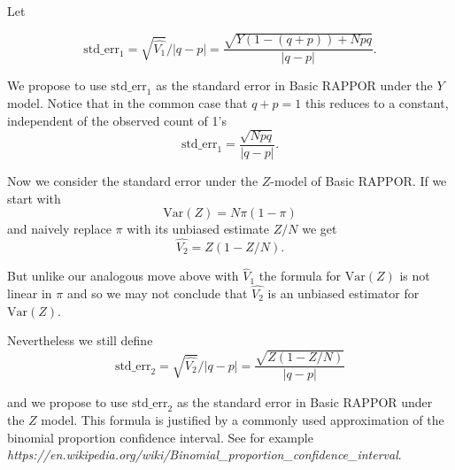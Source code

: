 \documentclass[oneside,12pt]{amsart}
\begin{document}
Let

$$\text{std\_err}_1 = \sqrt{\hat{V_1}}/|q-p| = \frac{\sqrt{Y (1 - (q+p)) + Npq}}{|q-p|}.$$

We propose to use $\text{std\_err}_1$ as the standard error in Basic RAPPOR
under the $Y$ model. Notice that in the common case that $q+p=1$ this reduces
to a constant, independent of the observed count of 1's
$$\text{std\_err}_1 = \frac{\sqrt{Npq}}{|q-p|}.$$

Now we consider the standard error under the $Z$-model of Basic RAPPOR.
If we start with
$$\text{Var}(Z) = N \pi (1 - \pi) $$
and naively replace $\pi$ with its unbiased estimate $Z/N$ we get
$$\hat{V_2} =   Z (1 - Z/N).$$

But unlike our analogous move above with $\hat{V}_1$ the formula for $\text{Var}(Z)$
is not linear in $\pi$ and so we may not conclude that $\hat{V_2}$ is an unbiased
estimator for $\text{Var}(Z)$.

Nevertheless we still define
$$\text{std\_err}_2 = \sqrt{\hat{V_2}}/|q-p| = \frac{\sqrt{Z (1 - Z/N)}}{|q-p|}$$

and we propose to use $\text{std\_err}_2$ as the standard error in Basic RAPPOR
under the $Z$ model. This formula is justified by a commonly used approximation
of the binomial proportion confidence interval. See for example
\emph{https://en.wikipedia.org/wiki/Binomial\_proportion\_confidence\_interval}.
\end{document}
